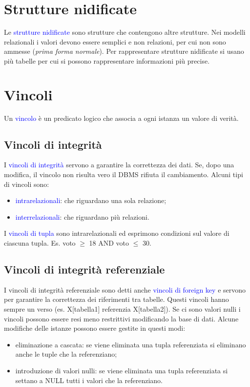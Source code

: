 \section{Strutture nidificate}

Le \textcolor{blue}{strutture nidificate } sono strutture che contengono altre strutture. Nei modelli relazionali i valori devono essere semplici e non relazioni, per cui non sono ammesse (\textit{prima forma normale}). Per rappresentare strutture nidificate si usano più tabelle per cui si possono rappresentare informazioni più precise.

\section{Vincoli}
\label{Vincoli}
Un \textcolor{blue}{vincolo} è un predicato logico che associa a ogni istanza un valore di verità.

\subsection{Vincoli di integrità}

I \textcolor{blue}{vincoli di integrità} servono a garantire la correttezza dei dati. Se, dopo una modifica, il vincolo non risulta vero il DBMS rifiuta il cambiamento. Alcuni tipi di vincoli sono:
\begin{itemize}
    \item \textcolor{blue}{intrarelazionali}: che riguardano una sola relazione;
    \item \textcolor{blue}{interrelazionali}: che riguardano più relazioni.
\end{itemize}

I \textcolor{blue}{vincoli di tupla} sono intrarelazionali ed esprimono condizioni sul valore di ciascuna tupla. Es. voto $\geq$ 18 AND voto $\leq$ 30.

\subsection{Vincoli di integrità referenziale}

I vincoli di integrità referenziale sono detti anche \textcolor{blue}{vincoli di foreign key} e servono per garantire la correttezza dei riferimenti tra tabelle. Questi vincoli hanno sempre un verso (es. X[tabella1] referenzia X[tabella2]). Se ci sono valori nulli i vincoli possono essere resi meno restrittivi modificando la base di dati. Alcune modifiche delle istanze possono essere gestite in questi modi:
\begin{itemize}
    \item eliminazione a cascata: se viene eliminata una tupla referenziata si eliminano anche le tuple che la referenziano;
    \item introduzione di valori nulli: se viene eliminata una tupla referenziata si settano a NULL tutti i valori che la referenziano.
\end{itemize}

